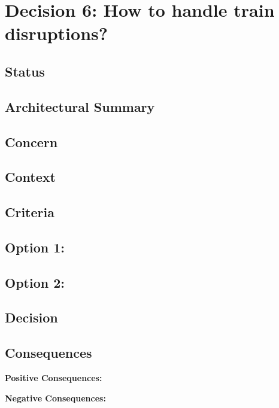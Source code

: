 \section*{Decision 6: How to handle train disruptions?}

\subsection*{Status}

\subsection*{Architectural Summary}


\subsection*{Concern}


\subsection*{Context}


\subsection*{Criteria}
\begin{itemize}
\end{itemize}

\subsection*{Option 1: }

\subsection*{Option 2: }

\subsection*{Decision}

\subsection*{Consequences}
\textbf{Positive Consequences:}
\begin{itemize}
\end{itemize}
\textbf{Negative Consequences:}
\begin{itemize}
\end{itemize}